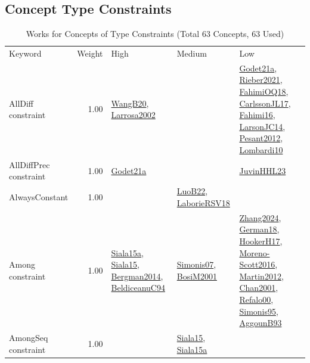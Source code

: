 \subsection{Concept Type Constraints}
\label{sec:Constraints}
\label{Constraints}
{\scriptsize
\begin{longtable}{p{3cm}r>{\raggedright\arraybackslash}p{6cm}>{\raggedright\arraybackslash}p{6cm}>{\raggedright\arraybackslash}p{8cm}}
\rowcolor{white}\caption{Works for Concepts of Type Constraints (Total 63 Concepts, 63 Used)}\\ \toprule
\rowcolor{white}Keyword & Weight & High & Medium & Low\\ \midrule\endhead
\bottomrule
\endfoot
\index{AllDiff constraint}\index{Constraints!AllDiff constraint}AllDiff constraint &  1.00 & \hyperref[detail:WangB20]{WangB20}, \hyperref[detail:Larrosa2002]{Larrosa2002} &  & \hyperref[detail:Godet21a]{Godet21a}, \hyperref[detail:Rieber2021]{Rieber2021}, \hyperref[detail:FahimiOQ18]{FahimiOQ18}, \hyperref[detail:CarlssonJL17]{CarlssonJL17}, \hyperref[detail:Fahimi16]{Fahimi16}, \hyperref[detail:LarsonJC14]{LarsonJC14}, \hyperref[detail:Pesant2012]{Pesant2012}, \hyperref[detail:Lombardi10]{Lombardi10}\\
\index{AllDiffPrec constraint}\index{Constraints!AllDiffPrec constraint}AllDiffPrec constraint &  1.00 & \hyperref[detail:Godet21a]{Godet21a} &  & \hyperref[detail:JuvinHHL23]{JuvinHHL23}\\
\index{AlwaysConstant}\index{Constraints!AlwaysConstant}AlwaysConstant &  1.00 &  & \hyperref[detail:LuoB22]{LuoB22}, \hyperref[detail:LaborieRSV18]{LaborieRSV18} & \\
\index{Among constraint}\index{Constraints!Among constraint}Among constraint &  1.00 & \hyperref[detail:Siala15a]{Siala15a}, \hyperref[detail:Siala15]{Siala15}, \hyperref[detail:Bergman2014]{Bergman2014}, \hyperref[detail:BeldiceanuC94]{BeldiceanuC94} & \hyperref[detail:Simonis07]{Simonis07}, \hyperref[detail:BosiM2001]{BosiM2001} & \hyperref[detail:Zhang2024]{Zhang2024}, \hyperref[detail:German18]{German18}, \hyperref[detail:HookerH17]{HookerH17}, \hyperref[detail:Moreno-Scott2016]{Moreno-Scott2016}, \hyperref[detail:Martin2012]{Martin2012}, \hyperref[detail:Chan2001]{Chan2001}, \hyperref[detail:Refalo00]{Refalo00}, \hyperref[detail:Simonis95]{Simonis95}, \hyperref[detail:AggounB93]{AggounB93}\\
\index{AmongSeq constraint}\index{Constraints!AmongSeq constraint}AmongSeq constraint &  1.00 &  & \hyperref[detail:Siala15]{Siala15}, \hyperref[detail:Siala15a]{Siala15a} & \\

\end{longtable}}
